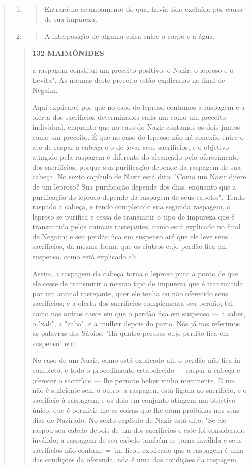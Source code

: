 \begin{quote}
\begin{enumerate}
\def\labelenumi{\arabic{enumi}.}
\setcounter{enumi}{150}
\item
 \begin{quote}
 Entrará no acampamento do qual havia sido excluído por causa de sua
 impureza.
 \end{quote}
\item
 \begin{quote}
 A interposição de alguma coisa entre o corpo e a água.
 \end{quote}
\end{enumerate}

\begin{quote}
\textbf{132 MAIMÔNIDES}

a raspagem constitui um preceito positivo: o Nazir, o leproso e o
Levita". As normas deste preceito estão explicadas no final de Negaim.

Aqui explicarei por que no caso do leproso contamos a raspagem e a
oferta dos sacrifícios determinados cada um como um preceito individual,
enquanto que no caso do Nazir contamos os dois juntos como um preceito.
É que no caso do leproso não há conexão entre o ato de raspar a cabeça e
o de levar seus sacrifícios, e o objetivo atingido pela raspagem é
diferente do al­cançado pelo oferecimento dos sacrifícios, porque sua
purificação depende da raspagem de sua cabeça. No sexto capítulo de
Nazir está dito: "Como um Nazir difere de um leproso? Sua purificação
depende dos dias, enquanto que a purifi­cação do leproso depende da
raspagem de seus cabelos". Tendo raspado a ca­beça, e tendo completado
sua segunda raspagem, o leproso se purifica e cessa de transmitir o tipo
de impureza que é transmitida pelos animais rastejantes, como está
explicado no final de Negaim; e seu perdão fica em suspenso até que ele
leve seus sacrifícios, da mesma forma que os ciutros cujo perdão fica em
suspenso, como está explicado ali.

Assim, a raspagem da cabeça torna o leproso puro a ponto de que ele
cesse de transmitir o mesmo tipo de impureza que é transmitida por um
animal rastejante, quer ele tenha ou não oferecido seus sacrifícios; e a
oferta dos sacrifícios complementa seu perdão, tal como nos outros casos
em que o perdão fica em suspenso --- a saber, o "zab", a "zaba", e a
mulher depois do parto. Nós já nos referimos às palavras dos Sábios: "Há
quatro pessoas cujo per­dão fica em suspenso" etc.

No caso de um Nazir, como está explicado ali, o perdão não fica
in­completo, e todo o procedimento estabelecido --- raspar a cabeça e
oferecer o sacrifício --- lhe permite beber vinho novamente. E um não é
suficiente sem o outro: a raspagem está ligada ao sacrifício, e o
sacrifício à raspagem, e os dois em conjunto atingem um objetivo único,
que é permitir-lhe as coisas que lhe eram proibidas nos seus dias de
Nazirado. No sexto capítulo de Nazir está dito: "Se ele raspou seu
cabelo depois de um dos sacrifícios e este foi considerado inválido, a
raspagem de seu cabelo também se torna inválida e seus sacrifícios não
contam. = 'm, ficou explicado que a raspagem é uma das condições da
oferenda, nda é uma das condições da raspagem.
\end{quote}


\end{quote}
